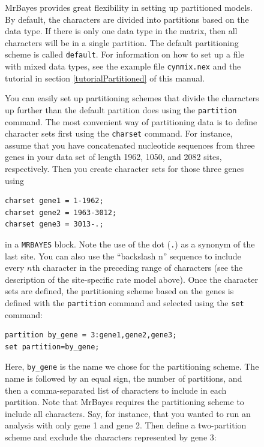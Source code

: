 \documentclass[12pt]{book}
\newcommand{\ttt}[1]{\texttt{#1}}
\begin{document}
\begin{figure}[h]
MrBayes provides great flexibility in setting up partitioned models. By default, the characters are
divided into partitions based on the data type. If there is only one data type in the matrix, then
all characters will be in a single partition. The default partitioning scheme is called
\ttt{default}. For information on how to set up a file with mixed data types, see the example file
\ttt{cynmix.nex} and the tutorial in section \ref{tutorialPartitioned} of this manual.

You can easily set up partitioning schemes that divide the characters up further than the default
partition does using the \ttt{partition} command. The most convenient way of partitioning data is
to define character sets first using the \ttt{charset} command. For instance, assume that you have
concatenated nucleotide sequences from three genes in your data set of length 1962, 1050, and 2082
sites, respectively. Then you create character sets for those three genes using

\begin{singlespacing}
\small
\begin{verbatim}
charset gene1 = 1-1962;
charset gene2 = 1963-3012;
charset gene3 = 3013-.;
\end{verbatim}
\normalsize
\end{singlespacing}

in a \ttt{MRBAYES} block. Note the use of the dot (\ttt{.}) as a synonym of the last site. You can
also use the ``backslash n'' sequence to include every $n$th character in the preceding range of
characters (see the description of the site-specific rate model above). Once the character sets are
defined, the partitioning scheme based on the genes is defined with the \ttt{partition} command and
selected using the \ttt{set} command:

\begin{singlespacing}
\small
\begin{verbatim}
partition by_gene = 3:gene1,gene2,gene3;
set partition=by_gene;
\end{verbatim}
\normalsize
\end{singlespacing}

Here, \ttt{by\_gene} is the name we chose for the partitioning scheme. The name is followed by an
equal sign, the number of partitions, and then a comma-separated list of characters to include in
each partition. Note that MrBayes requires the partitioning scheme to include all characters. Say,
for instance, that you wanted to run an analysis with only gene 1 and gene 2. Then define a
two-partition scheme and exclude the characters represented by gene 3:


\end{figure}
\end{document}
